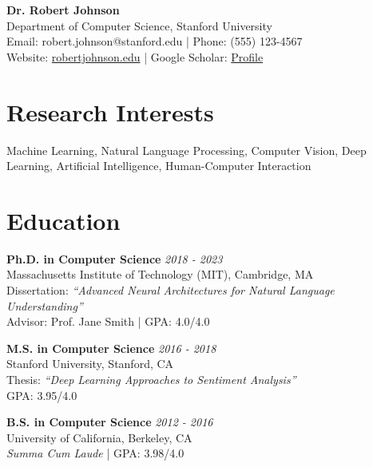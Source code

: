 \documentclass[11pt]{article}
\begin{document}
\begin{center}
    {\LARGE \textbf{Dr. Robert Johnson}} \\
    \vspace{0.1cm}
    Department of Computer Science, Stanford University \\
    Email: robert.johnson@stanford.edu | Phone: (555) 123-4567 \\
    Website: \href{https://robertjohnson.edu}{robertjohnson.edu} | 
    Google Scholar: \href{https://scholar.google.com/citations?user=xxx}{Profile}
\end{center}

\vspace{0.3cm}

\section*{Research Interests}
Machine Learning, Natural Language Processing, Computer Vision, Deep Learning, Artificial Intelligence, Human-Computer Interaction

\vspace{0.2cm}

\section*{Education}

\textbf{Ph.D. in Computer Science} \hfill \textit{2018 - 2023} \\
Massachusetts Institute of Technology (MIT), Cambridge, MA \\
Dissertation: \textit{``Advanced Neural Architectures for Natural Language Understanding''} \\
Advisor: Prof. Jane Smith | GPA: 4.0/4.0

\vspace{0.15cm}

\textbf{M.S. in Computer Science} \hfill \textit{2016 - 2018} \\
Stanford University, Stanford, CA \\
Thesis: \textit{``Deep Learning Approaches to Sentiment Analysis''} \\
GPA: 3.95/4.0

\vspace{0.15cm}

\textbf{B.S. in Computer Science} \hfill \textit{2012 - 2016} \\
University of California, Berkeley, CA \\
\textit{Summa Cum Laude} | GPA: 3.98/4.0
\end{document}
